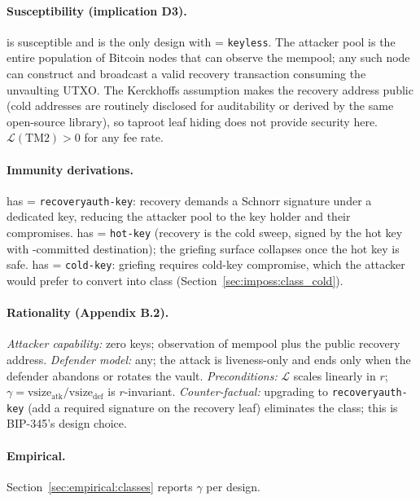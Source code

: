 \paragraph{Susceptibility (implication D3).} \opccv{} is susceptible
and is the only design with \axauth{} = \texttt{keyless}. The
attacker pool is the entire population of Bitcoin nodes that can
observe the mempool; any such node can construct and broadcast a
valid recovery transaction consuming the unvaulting UTXO. The
Kerckhoffs assumption makes the recovery address public (cold
addresses are routinely disclosed for auditability or derived by the
same open-source library), so taproot leaf hiding does not provide
security here. $\mathcal{L}(\mathrm{TM2}) > 0$ for any fee rate.

\paragraph{Immunity derivations.} \opvault{} has \axauth{} =
\texttt{recoveryauth-key}: recovery demands a Schnorr signature
under a dedicated key, reducing the attacker pool to the key holder
and their compromises. \opctv{} has \axauth{} = \texttt{hot-key}
(recovery is the cold sweep, signed by the hot key with
\opctv{}-committed destination); the griefing surface collapses once
the hot key is safe. \catcsfs{} has \axauth{} = \texttt{cold-key}:
griefing requires cold-key compromise, which the attacker would
prefer to convert into class \classcold{} (Section~\ref{sec:imposs:class_cold}).

\paragraph{Rationality (Appendix B.2).} \emph{Attacker capability:}
zero keys; observation of mempool plus the public recovery address.
\emph{Defender model:} any; the attack is liveness-only and ends
only when the defender abandons or rotates the vault.
\emph{Preconditions:} $\mathcal{L}$ scales linearly in $r$;
$\gamma = \text{vsize}_{\text{atk}}/\text{vsize}_{\text{def}}$ is
$r$-invariant. \emph{Counter-factual:} upgrading \axauth{} to
\texttt{recoveryauth-key} (add a required signature on the recovery
leaf) eliminates the class; this is BIP-345's design choice.

\paragraph{Empirical.} Section~\ref{sec:empirical:classes} reports
$\gamma$ per design.

